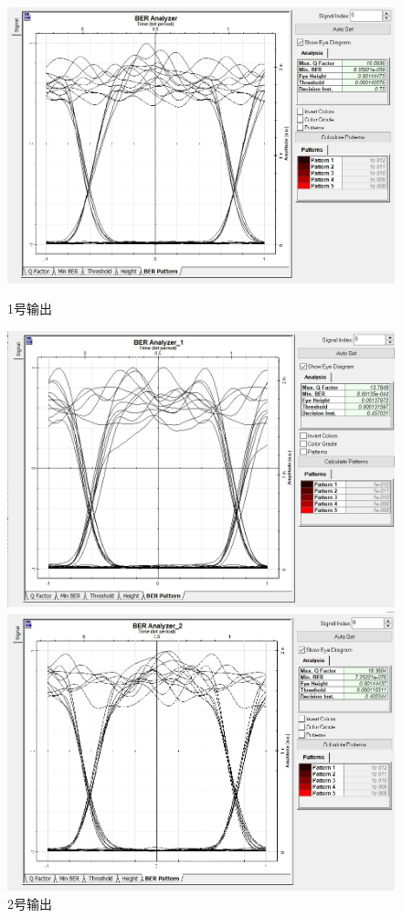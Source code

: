 \documentclass[12pt]{article}
\begin{document}
\begin{figure}[H]
  \begin{minipage}[t]{0.5\linewidth}
      \centering
      \includegraphics[scale=0.5]{1-BER.jpg}
      \caption{1号输出}
      \label{fig:side:a}
    \end{minipage}%
    \begin{minipage}[t]{0.5\linewidth}
      \centering
      \includegraphics[scale=0.5]{2-BER.jpg}
      \caption{2号输出}
      \label{fig:side:b}
    \end{minipage}
  \begin{minipage}[t]{0.5\linewidth}
      \centering
      \includegraphics[scale=0.5]{3-BER.jpg}

\end{minipage}
\end{figure}
\end{document}
